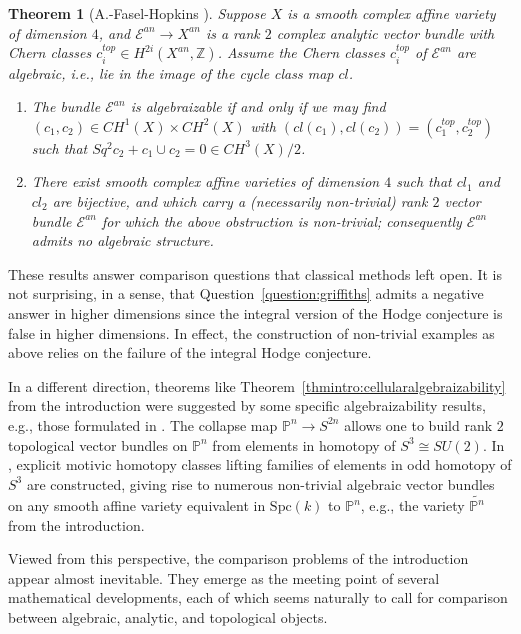 \documentclass[11pt,leqno]{article}
\newcommand{\Z}{{\mathbb Z}}
\renewcommand{\1}{{\rm 1\hspace*{-0.4ex}%
\rule{0.1ex}{1.52ex}\hspace*{0.2ex}}}
\newcommand{\Spc}{\mathrm{Spc}}
\newcommand{\<}[1]{{\langle}#1 {\rangle}}
\newcounter{intro}
\theoremstyle{plain}
\newtheorem{theorem}{Theorem}[subsection]
\theoremstyle{definition}
\theoremstyle{remark}
\numberwithin{equation}{subsection}
\begin{document}
\begin{theorem}[A.-Fasel-Hopkins {\cite{AsokFaselHopkins2019Obstructions}}]
	Suppose $X$ is a smooth complex affine variety of dimension $4$, and $\mathcal{E}^{an} \to X^{an}$ is a rank $2$ complex analytic vector bundle with Chern classes $c_i^{top} \in H^{2i}(X^{an},\Z)$.  Assume the Chern classes $c_i^{top}$ of $\mathcal{E}^{an}$ are algebraic, i.e., lie in the image of the cycle class map $cl$.  
	\begin{enumerate}[noitemsep,topsep=1pt]
		\item The bundle $\mathcal{E}^{an}$ is algebraizable if and only if we may find $(c_1,c_2) \in CH^1(X) \times CH^2(X)$ with $(cl(c_1),cl(c_2)) = (c_1^{top},c_2^{top})$ such that $Sq^2c_2 + c_1 \cup c_2 = 0 \in CH^3(X)/2$.
		\item There exist smooth complex affine varieties of dimension $4$ such that $cl_1$ and $cl_2$ are bijective, and which carry a (necessarily non-trivial) rank $2$ vector bundle $\mathcal{E}^{an}$ for which the above obstruction is non-trivial; consequently $\mathcal{E}^{an}$ admits no algebraic structure. 
	\end{enumerate}
\end{theorem}

These results answer comparison questions that classical methods left open.  It is not surprising, in a sense, that Question~\ref{question:griffiths} admits a negative answer in higher dimensions since the integral version of the Hodge conjecture is false in higher dimensions.  In effect, the construction of non-trivial examples as above relies on the failure of the integral Hodge conjecture.  

In a different direction, theorems like Theorem~\ref{thmintro:cellularalgebraizability} from the introduction were suggested by some specific algebraizability results, e.g., those formulated in \cite{AFHRees}.  The collapse map ${\mathbb P}^n \to S^{2n}$ allows one to build rank $2$ topological vector bundles on ${\mathbb P}^n$ from elements in homotopy of $S^3 \cong SU(2)$.  In \cite{AFHRees}, explicit motivic homotopy classes lifting families of elements in odd homotopy of $S^3$ are constructed, giving rise to numerous non-trivial algebraic vector bundles on any smooth affine variety equivalent in $\Spc(k)$ to ${\mathbb P}^n$, e.g., the variety $\widetilde{{\mathbb P}^n}$ from the introduction.

Viewed from this perspective, the comparison problems of the introduction appear almost inevitable. They emerge as the meeting point of several mathematical developments, each of which seems naturally to call for comparison between algebraic, analytic, and topological objects.
\end{document}
